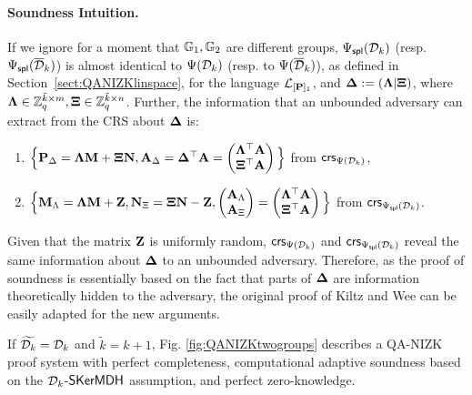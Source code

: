 \paragraph{Soundness Intuition.}   If we ignore for a moment that $\mathbb{G}_1, \mathbb{G}_2$ are different groups, ${\Psi_{\mathsf{spl}}(\mathcal{D}_k)}$ (resp. ${\Psi_\mathsf{spl}(\overline{\mathcal{D}}_k)}$) is almost identical to $\Psi({\mathcal{D}_k})$ (resp. to ${\Psi(\overline{\mathcal{D}}_k)}$), as defined in Section~\ref{sect:QANIZKlinspace}, for the language $\mathcal{L}_{[\mathbf{{P}}]_1}$, and $\mathbf{{\Delta}}:=(\mathbf{{\Lambda}}|\mathbf{{\Xi}})$, where  $\mathbf{{\Lambda}} \in \mathbb{Z}_q^{\tilde{k} \times m},\mathbf{{\Xi}} \in \mathbb{Z}_q^{\tilde{k} \times n}$. Further, the information that an unbounded adversary can extract from the CRS about $\mathbf{{\Delta}}$ is:
 \begin{enumerate}
 \item $\Big\{\mathbf{{P}}_\Delta= \mathbf{{\Lambda}} \mathbf{{M}}+ \mathbf{{\Xi}}\mathbf{{N}}, \mathbf{{A}}_{\Delta} = \mathbf{{\Delta}}^{\top}\mathbf{{A}} =\begin{pmatrix} \mathbf{{\Lambda}}^{\top}\mathbf{{A}} \\ \mathbf{{\Xi}}^{\top}\mathbf{{A}} \end{pmatrix}\Big\}$ from $\mathsf{crs}_{\Psi({\mathcal{D}_k})}$, 
 \item $\Big\{ \mathbf{{M}}_\Lambda = \mathbf{{\Lambda}} \mathbf{{M}}+\mathbf{{Z}}, \mathbf{{N}}_\Xi = \mathbf{{\Xi}}\mathbf{{N}}-\mathbf{{Z}},  \begin{pmatrix}\mathbf{{A}}_\Lambda\\\mathbf{{A}}_\Xi\end{pmatrix} = \begin{pmatrix} \mathbf{{\Lambda}}^{\top}\mathbf{{A}} \\ \mathbf{{\Xi}}^{\top}\mathbf{{A}} \end{pmatrix} \Big\}$ from $\mathsf{crs}_{{\Psi_{\mathsf{spl}}(\mathcal{D}_k)}}$. 
 \end{enumerate}
Given that the matrix $\mathbf{{Z}}$ is uniformly random,  $\mathsf{crs}_{\Psi({\mathcal{D}_k})}$ and $\mathsf{crs}_{{\Psi_{\mathsf{spl}}(\mathcal{D}_k)}}$
reveal the same information about $\mathbf{{\Delta}}$ to an unbounded adversary. Therefore, as the proof of soundness is essentially based on the fact that parts of $\mathbf{{\Delta}}$ are information theoretically hidden to the adversary, the original proof of Kiltz and Wee can be easily adapted for the new arguments. 

\begin{theorem} If $\widetilde{\mathcal{D}_{k}}=\mathcal{D}_k$ and $\tilde{k}=k+1$,  Fig. \ref{fig:QANIZKtwogroups} describes a QA-NIZK
proof system with perfect completeness, computational adaptive soundness based on the  $\mathcal{D}_{k}$-$\mathsf{SKerMDH}$ assumption, and perfect zero-knowledge. 
\label{theo:membtwogroups1}
\end{theorem}

